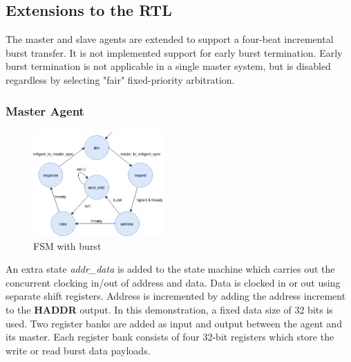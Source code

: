 \subsection{Extensions to the RTL}
The master and slave agents are extended to support a four-beat incremental burst transfer. It is not implemented support for early burst termination. Early burst termination is not applicable in a single master system, but is disabled regardless by selecting "fair" fixed-priority arbitration.  
 
\subsubsection{Master Agent}
\begin{figure}
\includegraphics[width=5cm]{figs/hw/mAgent_burstfsm.png}
\caption{FSM with burst}\label{fig:magt-burstfsm}
\end{figure} 

An extra state \textit{addr\_data} is added to the state machine which carries out the concurrent clocking in/out of address and data. Data is clocked in or out using separate shift registers. Address is incremented by adding the address increment to the \textbf{HADDR} output. In this demonstration, a fixed data size of 32 bits is used. Two register banks are added as input and output between the agent and its master. Each register bank consists of four 32-bit registers which store the write or read burst data payloads. 

